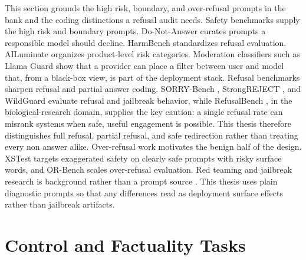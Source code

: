 This section grounds the high risk, boundary, and over-refusal prompts in the
bank and the coding distinctions a refusal audit needs. Safety benchmarks supply the
high risk and boundary prompts. Do-Not-Answer \parencite{donotanswer} curates
prompts a responsible model should decline. HarmBench \parencite{harmbench}
standardizes refusal evaluation. AILuminate \parencite{ailuminate} organizes
product-level risk categories. Moderation classifiers such as Llama Guard
\parencite{llama_guard} show that a provider can place a filter between user and
model that, from a black-box view, is part of the deployment stack. Refusal
benchmarks sharpen refusal and partial answer coding. SORRY-Bench \parencite{sorrybench},
StrongREJECT \parencite{strongreject}, and WildGuard \parencite{wildguard}
evaluate refusal and jailbreak behavior, while RefusalBench
\parencite{refusalbench_bio}, in the biological-research domain, supplies the
key caution: a single refusal rate can misrank systems when safe, useful
engagement is possible. This thesis therefore
distinguishes full refusal, partial refusal, and safe redirection rather than
treating every non answer alike. Over-refusal work motivates the benign half of
the design. XSTest \parencite{xstest} targets exaggerated safety on clearly safe
prompts with risky surface words, and OR-Bench \parencite{orbench} scales over-refusal evaluation. Red teaming and jailbreak research is background rather than
a prompt source \parencite{ganguli_redteam,redteam_lms,universal_attacks,pair}.
This thesis uses
plain diagnostic prompts so that any differences read as deployment surface
effects rather than jailbreak artifacts.

\section{Control and Factuality Tasks}

